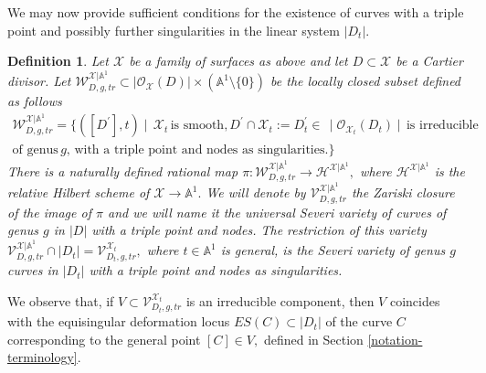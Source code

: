 \documentclass[plain]{amsart}
\newtheorem{definition}[theorem]{\textbf{Definition}}
\begin{document}
We may now provide sufficient conditions for the existence 
of curves with a triple point and possibly further singularities in the linear system  $|D_t|.$

\begin{definition}
Let $\mathcal X$  be a family of surfaces as above and let $D\subset \mathcal X$ be a Cartier divisor.
Let $\mathcal W^{\mathcal X|\mathbb A^1}_{D,g,tr} \subset |\mathcal
O_{\mathcal X}(D)|\times (\mathbb A^1\setminus\{0\})$ be the locally closed subset defined as follows
\begin{eqnarray*}
\mathcal W^{\mathcal X|\mathbb A^1}_{D,g,tr} =\{([D^\prime],t)\mid\,\mathcal
X_t\,\textrm{is smooth,}\, D^\prime\cap \mathcal X_t:=D_t^\prime\in\,\mid\mathcal
O_{ \mathcal X_t}(D_t)\mid\, \textrm{is
irreducible}\\
\textrm{of genus}\,g,\,\textrm{with a triple point and nodes as singularities}.\}
\end{eqnarray*}
There is a naturally defined rational map $\pi:\mathcal W^{\mathcal X|\mathbb A^1}_{D,g,tr} \to\mathcal H^{\mathcal X|\mathbb A^1},$
where $\mathcal H^{\mathcal X|\mathbb A^1}$ is the relative Hilbert scheme of $\mathcal X\to\mathbb A^1.$
We will denote by $\mathcal V^{\mathcal X|\mathbb A^1}_{D,g,tr}$ the Zariski closure of the image of $\pi$ 
and we will name it the universal Severi variety
of curves of genus $g$ in $|D|$ with a triple point and nodes. The restriction of this variety 
$\mathcal V^{\mathcal X|\mathbb A^1}_{D,g,tr}\cap |D_t|=\mathcal V^{\mathcal X_t}_{D_t,g,tr},$
where $t\in\mathbb A^1$ is general, is the Severi variety of genus $g$ curves in $|D_t|$
with a triple point and nodes as singularities.
\end{definition}
We observe that, if $V\subset \mathcal V^{\mathcal X_t}_{D_t,g,tr} $ is an irreducible component, then 
 $V$ coincides with
the equisingular deformation locus $ES(C)\subset |D_t|$ of the curve $C$ corresponding to the general point
$[C]\in V,$ defined in Section \ref{notation-terminology}. 
\end{document}
